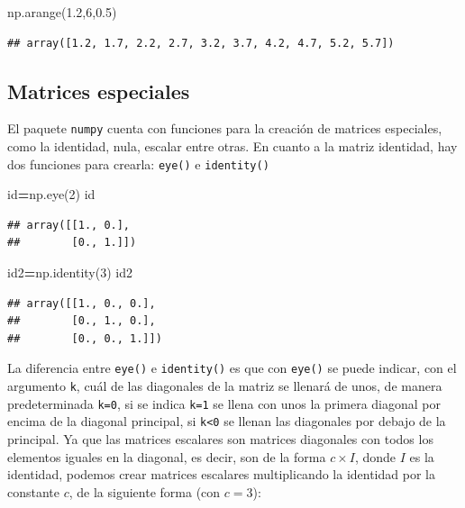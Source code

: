 \documentclass[
]{book}
\newenvironment{Shaded}{\begin{snugshade}}{\end{snugshade}}
\newcommand{\BuiltInTok}[1]{#1}
\newcommand{\DecValTok}[1]{\textcolor[rgb]{0.00,0.00,0.81}{#1}}
\newcommand{\FloatTok}[1]{\textcolor[rgb]{0.00,0.00,0.81}{#1}}
\newcommand{\NormalTok}[1]{#1}
\newcommand{\OperatorTok}[1]{\textcolor[rgb]{0.81,0.36,0.00}{\textbf{#1}}}
\theoremstyle{definition}
\theoremstyle{definition}
\theoremstyle{definition}
\theoremstyle{definition}
\theoremstyle{remark}
\begin{document}
\begin{Shaded}
\begin{Highlighting}[]
\NormalTok{np.arange(}\FloatTok{1.2}\NormalTok{,}\DecValTok{6}\NormalTok{,}\FloatTok{0.5}\NormalTok{)}
\end{Highlighting}
\end{Shaded}

\begin{verbatim}
## array([1.2, 1.7, 2.2, 2.7, 3.2, 3.7, 4.2, 4.7, 5.2, 5.7])
\end{verbatim}

\hypertarget{matrices-especiales}{%
\subsection{Matrices especiales}\label{matrices-especiales}}

El paquete \texttt{numpy} cuenta con funciones para la creación de matrices especiales, como la identidad, nula, escalar entre otras. En cuanto a la matriz identidad, hay dos funciones para crearla: \texttt{eye()} e \texttt{identity()}

\begin{Shaded}
\begin{Highlighting}[]
\BuiltInTok{id}\OperatorTok{=}\NormalTok{np.eye(}\DecValTok{2}\NormalTok{)}
\BuiltInTok{id}
\end{Highlighting}
\end{Shaded}

\begin{verbatim}
## array([[1., 0.],
##        [0., 1.]])
\end{verbatim}

\begin{Shaded}
\begin{Highlighting}[]
\NormalTok{id2}\OperatorTok{=}\NormalTok{np.identity(}\DecValTok{3}\NormalTok{)}
\NormalTok{id2}
\end{Highlighting}
\end{Shaded}

\begin{verbatim}
## array([[1., 0., 0.],
##        [0., 1., 0.],
##        [0., 0., 1.]])
\end{verbatim}

La diferencia entre \texttt{eye()} e \texttt{identity()} es que con \texttt{eye()} se puede indicar, con el argumento \texttt{k}, cuál de las diagonales de la matriz se llenará de unos, de manera predeterminada \texttt{k=0}, si se indica \texttt{k=1} se llena con unos la primera diagonal por encima de la diagonal principal, si \texttt{k\textless{}0} se llenan las diagonales por debajo de la principal.
Ya que las matrices escalares son matrices diagonales con todos los elementos iguales en la diagonal, es decir, son de la forma \(c\times I\), donde \(I\) es la identidad, podemos crear matrices escalares multiplicando la identidad por la constante \(c\), de la siguiente forma (con \(c=3\)):
\end{document}
